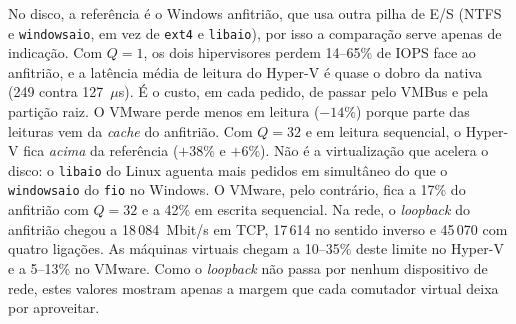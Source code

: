 \documentclass[conference]{IEEEtran}
\begin{document}
No disco, a referência é o Windows anfitrião, que usa outra pilha de E/S (NTFS e \texttt{windowsaio}, em vez de \texttt{ext4} e \texttt{libaio}), por isso a comparação serve apenas de indicação. Com $Q=1$, os dois hipervisores perdem 14--65\% de IOPS face ao anfitrião, e a latência média de leitura do Hyper-V é quase o dobro da nativa (249 contra 127~$\mu$s). É o custo, em cada pedido, de passar pelo VMBus e pela partição raiz. O VMware perde menos em leitura ($-14\%$) porque parte das leituras vem da \textit{cache} do anfitrião. Com $Q=32$ e em leitura sequencial, o Hyper-V fica \textit{acima} da referência ($+38\%$ e $+6\%$). Não é a virtualização que acelera o disco: o \texttt{libaio} do Linux aguenta mais pedidos em simultâneo do que o \texttt{windowsaio} do \texttt{fio} no Windows. O VMware, pelo contrário, fica a 17\% do anfitrião com $Q=32$ e a 42\% em escrita sequencial. Na rede, o \textit{loopback} do anfitrião chegou a 18\,084~Mbit/s em TCP, 17\,614 no sentido inverso e 45\,070 com quatro ligações. As máquinas virtuais chegam a 10--35\% deste limite no Hyper-V e a 5--13\% no VMware. Como o \textit{loopback} não passa por nenhum dispositivo de rede, estes valores mostram apenas a margem que cada comutador virtual deixa por aproveitar.
\end{document}
